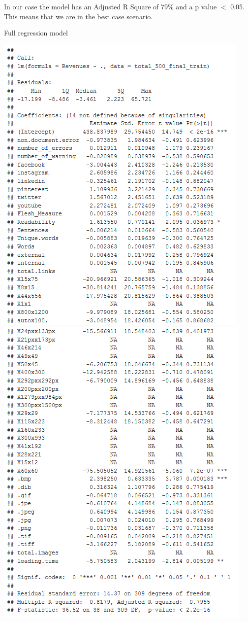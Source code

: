 \documentclass{article}
\begin{document}
In our case the model has an Adjusted R Square of 79\% and a p value $<$ 0.05. This means that we are in the best case scenario. 
\begin{table}[H]
\centering
\caption{Full regression model}
\begin{center}
\includegraphics[scale=0.6]{../R/photos/66_FULL_PART1.PNG} 
\includegraphics[scale=0.6]{../R/photos/66_FULL_PART2.PNG}  \\
\end{center}
\end{table}
\end{document}
